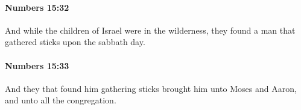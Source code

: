 		\paragraph{Numbers 15:32} %
			\label{NUMBERS-15-32}

			And while the children of Israel were in the wilderness, they found a man that gathered sticks upon the sabbath day.


		\paragraph{Numbers 15:33} %
			\label{NUMBERS-15-33}

			And they that found him gathering sticks brought him unto Moses and Aaron, and unto all the congregation.


